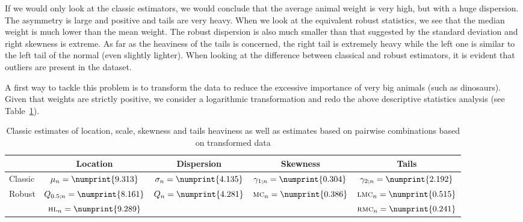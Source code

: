 \begin{stexample}
If we would only look at the classic estimators, we would conclude that the
average animal weight is very high, but with a huge dispersion. The asymmetry
is large and positive and tails are very heavy. When we look at the equivalent
robust statistics, we see that the median weight is much lower than the mean
weight. The robust dispersion is also much smaller than that suggested by the
standard deviation and right skewness is extreme. As far as the heaviness of
the tails is concerned, the right tail is extremely heavy while the left one is
similar to the left tail of the normal (even slightly lighter). When looking at
the difference between classical and robust estimators, it is evident that
outliers are present in the dataset.

A first way to tackle this problem is to transform the data to reduce the
excessive importance of very big animals (such as dinosaurs). Given that
weights are strictly positive, we consider a logarithmic transformation and
redo the above descriptive statistics analysis (see
Table~\ref{tab:estimates_transformed_data}).


\begin{table}[h!]
    \centering
    \caption{Classic estimates of location, scale, skewness and tails heaviness
    as well as estimates based on pairwise combinations based on transformed data}
    \label{tab:estimates_transformed_data}
    \begin{tabular}{lcccc}
        \toprule
                  & Location 
                  & Dispersion 
                  & Skewness 
                  & Tails
        \\\midrule
        Classic   & $\mu_n          = \numprint{9.313}$ 
                  & $\sigma_n       = \numprint{4.135}$ 
                  & $\gamma_{1;n}   = \numprint{0.304}$ 
                  & $\gamma_{2;n}   = \numprint{2.192}$
        \\\addlinespace
        Robust    & $Q_{0.5;n}      = \numprint{8.161}$
                  & $Q_n            = \numprint{4.281}$
                  & $\stsc{MC}_n    = \numprint{0.386}$
                  & $\stsc{LMC}_n   = \numprint{0.515}$
        \\
                  & $\stsc{HL}_n    = \numprint{9.289}$
                  &
                  &
                  & $\stsc{RMC}_n   = \numprint{0.241}$
        \\\bottomrule
    \end{tabular}
\end{table}


\end{stexample}
